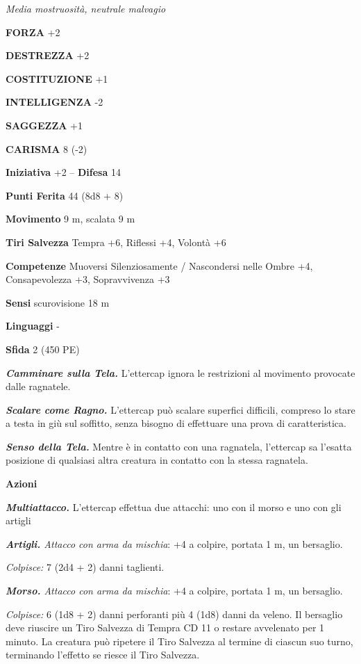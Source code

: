 \begin{multicols}{2}
\emph{Media mostruosità, neutrale malvagio}

\textbf{FORZA} +2

\textbf{DESTREZZA} +2

\textbf{COSTITUZIONE} +1

\textbf{INTELLIGENZA} -2

\textbf{SAGGEZZA} +1

\textbf{CARISMA} 8 (-2)

\textbf{Iniziativa} +2 -- \textbf{Difesa} 14

\textbf{Punti Ferita} 44 (8d8 + 8)

\textbf{Movimento} 9 m, scalata 9 m

\textbf{Tiri Salvezza} Tempra +6, Riflessi +4, Volontà +6

\textbf{Competenze} Muoversi Silenziosamente / Nascondersi nelle Ombre +4, Consapevolezza +3, Sopravvivenza +3

\textbf{Sensi} scurovisione 18 m

\textbf{Linguaggi} -

\textbf{Sfida} 2 (450 PE)

\emph{\textbf{Camminare sulla Tela.}} L'ettercap ignora le restrizioni al movimento provocate dalle ragnatele.

\emph{\textbf{Scalare come Ragno.}} L'ettercap può scalare superfici difficili, compreso lo stare a testa in giù sul soffitto, senza bisogno di effettuare una prova di caratteristica.

\emph{\textbf{Senso della Tela.}} Mentre è in contatto con una ragnatela, l'ettercap sa l'esatta posizione di qualsiasi altra creatura in contatto con la stessa ragnatela.

\textbf{Azioni}

\emph{\textbf{Multiattacco.}} L'ettercap effettua due attacchi: uno con il morso e uno con gli artigli

\emph{\textbf{Artigli.} Attacco con arma da mischia}: +4 a colpire, portata 1 m, un bersaglio.

\emph{Colpisce:} 7 (2d4 + 2) danni taglienti.

\emph{\textbf{Morso.} Attacco con arma da mischia}: +4 a colpire, portata 1 m, un bersaglio.

\emph{Colpisce:} 6 (1d8 + 2) danni perforanti più 4 (1d8) danni da veleno. Il bersaglio deve riuscire un Tiro Salvezza di Tempra CD 11 o restare avvelenato per 1 minuto. La creatura può ripetere il Tiro Salvezza al termine di ciascun suo turno, terminando l'effetto se riesce il Tiro Salvezza.


\end{multicols}
